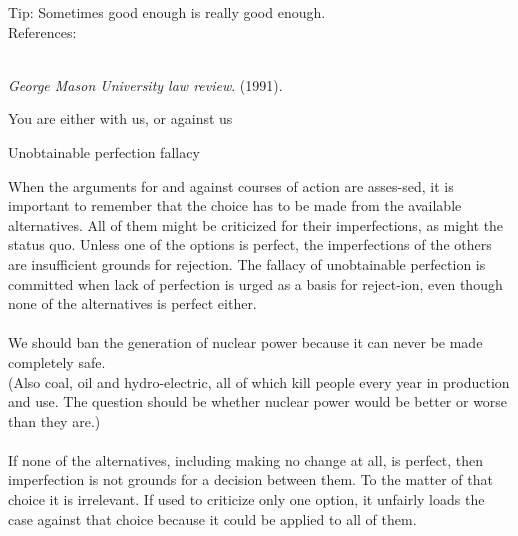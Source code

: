 \documentclass[a4paper,12pt,single,pdftex]{scrartcl}
\begin{document}
{    
      Tip: Sometimes good enough is really good enough.
    \\

    References:

    
      
        
      \\

      
        
          {\it George Mason University law review}. (1991).
        
      
    
  }


You are either with us, or against us

Unobtainable perfection fallacy
    
      When the arguments for and against courses of action are asses-sed, it is important to remember that the choice has to be made from the available alternatives. All of them might be criticized for their imperfections, as might the status quo. Unless one of the options is perfect, the imperfections of the others are insufficient grounds for rejection. The fallacy of unobtainable perfection is committed when lack of perfection is urged as a basis for reject-ion, even though none of the alternatives is perfect either.
    \\

    
      
    \\

    
      We should ban the generation of nuclear power because it can never be made completely safe.
    \\

    
      (Also coal, oil and hydro-electric, all of which kill people every year in production and use. The question should be whether nuclear power would be better or worse than they are.)
    \\

    
      
    \\

    
      If none of the alternatives, including making no change at all, is perfect, then imperfection is not grounds for a decision between them. To the matter of that choice it is irrelevant. If used to criticize only one option, it unfairly loads the case against that choice because it could be applied to all of them.
    \\

    
      
\end{document}
